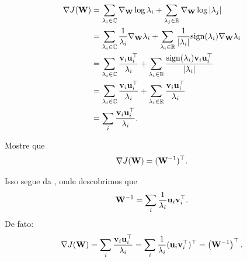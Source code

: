 \begin{exenumerate}
\begin{solution}
\begin{align}
            \nabla J(\mathbf{W}) &= \sum_{\lambda_i \in \mathbb{C}}  \nabla_{\mathbf{W}}\log \lambda_i + \sum_{\lambda_j \in \mathbb{R}}  \nabla_{\mathbf{W}} \log |\lambda_j|\\ 
            &= \sum_{\lambda_i \in \mathbb{C}} \frac{1}{\lambda_i} \nabla_{\mathbf{W}} \lambda_i + 
            \sum_{\lambda_i \in \mathbb{R}} \frac{1}{|\lambda_i|} \textrm{sign}(\lambda_i)\nabla_{\mathbf{W}}\lambda_i\\
            &= \sum_{\lambda_i \in \mathbb{C}} \frac{\mathbf{v}_i\mathbf{u}_i^\top}{\lambda_i} + 
            \sum_{\lambda_i \in \mathbb{R}} \frac{\textrm{sign}(\lambda_i)\mathbf{v}_i\mathbf{u}_i^\top}{|\lambda_i|} \\
            &= \sum_{\lambda_i \in \mathbb{C}} \frac{\mathbf{v}_i\mathbf{u}_i^\top}{\lambda_i} + 
            \sum_{\lambda_i \in \mathbb{R}} \frac{\mathbf{v}_i\mathbf{u}_i^\top}{\lambda_i} \\
            &= \sum_i  \frac{\mathbf{v}_i\mathbf{u}_i^\top}{\lambda_i}.
        \end{align}
        
    \end{solution}
    \item Mostre que
    \begin{equation}
        \nabla J(\mathbf{W}) = (\mathbf{W}^{-1})^\top.
    \end{equation}
    
    \begin{solution}
        Isso segue da , onde descobrimos
        que
        \begin{equation}
            \mathbf{W}^{-1}= \sum_i \frac{1}{\lambda_i}\mathbf{u}_i \mathbf{v}_i^\top.
        \end{equation}
        De fato:
        \begin{align}
            \nabla J(\mathbf{W}) = \sum_i  \frac{\mathbf{v}_i\mathbf{u}_i^\top}{\lambda_i} = \sum_i \frac{1}{\lambda_i} (\mathbf{u}_i\mathbf{v}_i^\top)^\top =  \left(\mathbf{W}^{-1}\right)^\top.
        \end{align}
        
    \end{solution}
\end{exenumerate}


